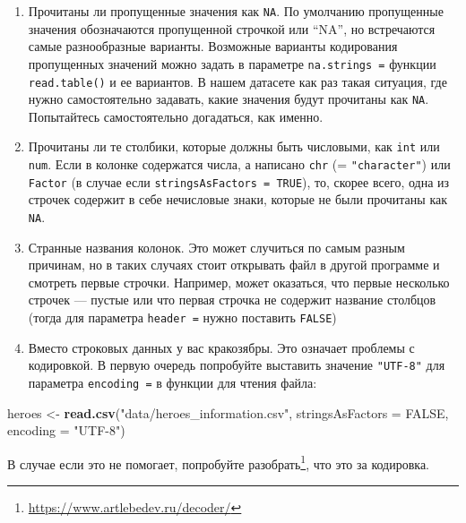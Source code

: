 \documentclass[
]{book}
\newenvironment{Shaded}{\begin{snugshade}}{\end{snugshade}}
\newcommand{\DataTypeTok}[1]{\textcolor[rgb]{0.13,0.29,0.53}{#1}}
\newcommand{\KeywordTok}[1]{\textcolor[rgb]{0.13,0.29,0.53}{\textbf{#1}}}
\newcommand{\NormalTok}[1]{#1}
\newcommand{\OtherTok}[1]{\textcolor[rgb]{0.56,0.35,0.01}{#1}}
\newcommand{\StringTok}[1]{\textcolor[rgb]{0.31,0.60,0.02}{#1}}
\renewcommand{\href}[2]{#2\footnote{\url{#1}}}
\begin{document}
\begin{enumerate}
\def\labelenumi{\arabic{enumi}.}
\item
  Прочитаны ли пропущенные значения как \texttt{NA}. По умолчанию пропущенные значения обозначаются пропущенной строчкой или ``NA'', но встречаются самые разнообразные варианты. Возможные варианты кодирования пропущенных значений можно задать в параметре \texttt{na.strings\ =} функции \texttt{read.table()} и ее вариантов. В нашем датасете как раз такая ситуация, где нужно самостоятельно задавать, какие значения будут прочитаны как \texttt{NA}. Попытайтесь самостоятельно догадаться, как именно.
\item
  Прочитаны ли те столбики, которые должны быть числовыми, как \texttt{int} или \texttt{num}. Если в колонке содержатся числа, а написано \texttt{chr} (= \texttt{"character"}) или \texttt{Factor} (в случае если \texttt{stringsAsFactors\ =\ TRUE}), то, скорее всего, одна из строчек содержит в себе нечисловые знаки, которые не были прочитаны как \texttt{NA}.
\item
  Странные названия колонок. Это может случиться по самым разным причинам, но в таких случаях стоит открывать файл в другой программе и смотреть первые строчки. Например, может оказаться, что первые несколько строчек --- пустые или что первая строчка не содержит название столбцов (тогда для параметра \texttt{header\ =} нужно поставить \texttt{FALSE})
\item
  Вместо строковых данных у вас кракозябры. Это означает проблемы с кодировкой. В первую очередь попробуйте выставить значение \texttt{"UTF-8"} для параметра \texttt{encoding\ =} в функции для чтения файла:
\end{enumerate}

\begin{Shaded}
\begin{Highlighting}[]
\NormalTok{heroes <-}\StringTok{ }\KeywordTok{read.csv}\NormalTok{(}\StringTok{"data/heroes_information.csv"}\NormalTok{, }
                   \DataTypeTok{stringsAsFactors =} \OtherTok{FALSE}\NormalTok{,}
                   \DataTypeTok{encoding =} \StringTok{"UTF-8"}\NormalTok{)}
\end{Highlighting}
\end{Shaded}

В случае если это не помогает, попробуйте \href{https://www.artlebedev.ru/decoder/}{разобрать}, что это за кодировка.
\end{document}
